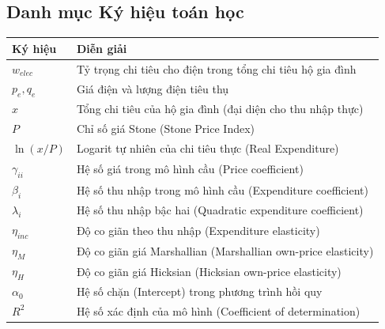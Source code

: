\documentclass[12pt,a4paper,oneside]{article}
\begin{document}
\subsection{Danh mục Ký hiệu toán học}
\begin{longtable}{p{} p{}}
	\toprule
	\textbf{Ký hiệu} & \textbf{Diễn giải} \\
	\midrule
	$w_{elec}$ & Tỷ trọng chi tiêu cho điện trong tổng chi tiêu hộ gia đình \\
	$p_e, q_e$ & Giá điện và lượng điện tiêu thụ \\
	$x$ & Tổng chi tiêu của hộ gia đình (đại diện cho thu nhập thực) \\
	$P$ & Chỉ số giá Stone (Stone Price Index) \\
	$\ln(x/P)$ & Logarit tự nhiên của chi tiêu thực (Real Expenditure) \\
	$\gamma_{ii}$ & Hệ số giá trong mô hình cầu (Price coefficient) \\
	$\beta_i$ & Hệ số thu nhập trong mô hình cầu (Expenditure coefficient) \\
	$\lambda_i$ & Hệ số thu nhập bậc hai (Quadratic expenditure coefficient) \\
	$\eta_{inc}$ & Độ co giãn theo thu nhập (Expenditure elasticity) \\
	$\eta_{M}$ & Độ co giãn giá Marshallian (Marshallian own-price elasticity) \\
	$\eta_{H}$ & Độ co giãn giá Hicksian (Hicksian own-price elasticity) \\
	$\alpha_0$ & Hệ số chặn (Intercept) trong phương trình hồi quy \\
	$R^2$ & Hệ số xác định của mô hình (Coefficient of determination) \\
	\bottomrule
\end{longtable}
\end{document}
